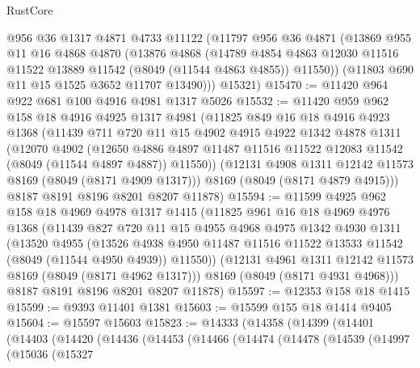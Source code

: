 \begin{lexlean}{RustCore}
\begin{coremodule}
      @956
      @36
      @1317
      @4871
      @4733
      @11122
      (@11797
        @956
        @36
        @4871
        (@13869
          @955
          @11
          @16
          @4868
          @4870
          (@13876
            @4868
            (@14789
              @4854
              @4863
              @12030
              @11516
              @11522
              @13889
              @11542
              (@8049 (@11544 @4863 @4855))
              @11550))
          (@11803 @690 @11 @15 @1525 @3652 @11707 @13490)))
      @15321)
@15470 := @11420 @964 @922 @681 @100 @4916 @4981 @1317 @5026
@15532 := @11420
    @959
    @962
    @158
    @18
    @4916
    @4925
    @1317
    @4981
    (@11825
      @849
      @16
      @18
      @4916
      @4923
      @1368
      (@11439
        @711
        @720
        @11
        @15
        @4902
        @4915
        @4922
        @1342
        @4878
        @1311
        (@12070
          @4902
          (@12650
            @4886
            @4897
            @11487
            @11516
            @11522
            @12083
            @11542
            (@8049 (@11544 @4897 @4887))
            @11550))
        (@12131 @4908 @1311 @12142 @11573 @8169 (@8049 (@8171 @4909 @1317)))
        @8169
        (@8049 (@8171 @4879 @4915)))
      @8187
      @8191
      @8196
      @8201
      @8207
      @11878)
@15594 := @11599
    @4925
    @962
    @158
    @18
    @4969
    @4978
    @1317
    @1415
    (@11825
      @961
      @16
      @18
      @4969
      @4976
      @1368
      (@11439
        @827
        @720
        @11
        @15
        @4955
        @4968
        @4975
        @1342
        @4930
        @1311
        (@13520
          @4955
          (@13526
            @4938
            @4950
            @11487
            @11516
            @11522
            @13533
            @11542
            (@8049 (@11544 @4950 @4939))
            @11550))
        (@12131 @4961 @1311 @12142 @11573 @8169 (@8049 (@8171 @4962 @1317)))
        @8169
        (@8049 (@8171 @4931 @4968)))
      @8187
      @8191
      @8196
      @8201
      @8207
      @11878)
@15597 := @12353 @158 @18 @1415
@15599 := @9393 @11401 @1381
@15603 := @15599 @155 @18 @1414 @9405
@15604 := @15597 @15603
@15823 := @14333
    (@14358
      (@14399
        (@14401
          (@14403
            (@14420
              (@14436
                (@14453
                  (@14466
                    (@14474
                      (@14478
                        (@14539
                          (@14997
                            (@15036
                              (@15327

\end{coremodule}
\end{lexlean}
